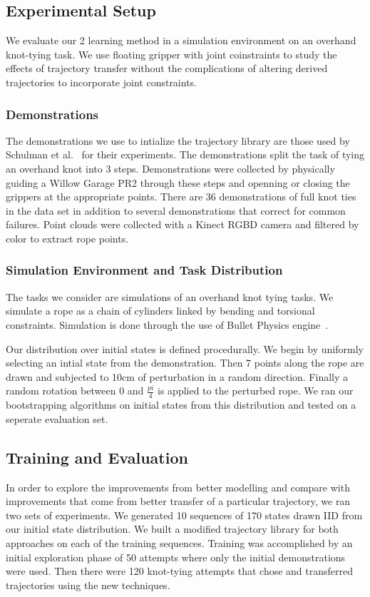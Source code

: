 \subsection{Experimental Setup}
We evaluate our 2 learning method in a simulation environment on an overhand knot-tying task.
We use floating gripper with joint coinstraints to study the effects of trajectory transfer
without the complications of altering derived trajectories to incorporate joint constraints.

\subsubsection{Demonstrations}
The demonstrations we use to intialize the trajectory library are those used by
Schulman et al.~\cite{Schulmanetal_ISRR2013} for their experiments. The demonstrations
split the task of tying an overhand knot into 3 steps. Demonstrations were collected
by physically guiding a Willow Garage PR2 through these steps and openning or closing 
the grippers at the appropriate points. There are 36 demonstrations of full knot ties
in the data set in addition to several demonstrations that correct for common failures.
Point clouds were collected with a Kinect RGBD camera and filtered by color to extract
rope points. 

\subsubsection{Simulation Environment and Task Distribution} 
The tasks we consider are simulations of an overhand knot tying tasks. 
We simulate a rope as a chain of cylinders linked by bending and torsional constraints.
Simulation is done through the use of Bullet Physics engine~\cite{Bullet_Physics}.

Our distribution over initial states is defined procedurally. We begin by uniformly
selecting an intial state from the demonstration. Then 7 points along the rope are 
drawn and subjected to 10cm of perturbation in a random direction. Finally a random
rotation between 0 and $\frac{pi}{4}$ is applied to the perturbed rope. We ran our
bootstrapping algorithms on initial states from this distribution and tested on a 
seperate evaluation set.

\subsection{Training and Evaluation}
In order to explore the improvements from better modelling and compare with improvements
that come from better transfer of a particular trajectory, we ran two sets of experiments.
We generated 10 sequences of 170 states drawn IID from our initial state distribution.
We built a modified trajectory library for both approaches on each of the training sequences.
Training was accomplished by an initial exploration phase of 50 attempts where only the initial
demonstrations were used. Then there were 120 knot-tying attempts that chose and transferred
trajectories using the new techniques.
